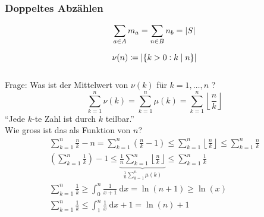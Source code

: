 \subsubsection{Doppeltes Abzählen}
\[ \sum_{a \in A} m_a = \sum_{n \in B} n_b = \abs{S} \]
\begin{bsp*}
	\[\nu(n) \coloneqq \abs{\{ k> 0 : k \mid n \}} \]\\
	Frage: Was ist der Mittelwert von $\nu(k)$ für $k=1, \dotsc , n$ ? \\
	\[ \sum_{k=1}^n \nu(k) = \sum_{k=1}^n \mu(k) = \sum_{k=1}^n \left\lfloor \frac{n}{k} \right\rfloor \]
	\enquote{Jede $k$-te Zahl ist durch $k$ teilbar.} \\
	Wie gross ist das als Funktion von $n$? \\
	\begin{gather*}
		\sum_{k=1}^n \frac{n}{k} - n = \sum_{k=1}^n (\frac{n}{k} - 1) \leq \sum_{k=1}^n \left\lfloor \frac{n}{k} \right\rfloor \leq \sum_{k=1}^n \frac{n}{k} \\
		\left(\sum_{k=1}^n \frac{1}{k}\right) -1 \leq \underbrace{\frac{1}{n} \sum_{k=1}^n \left\lfloor \frac{n}{k} \right\rfloor}_{\frac{1}{n} \sum_{k=1}^n \mu(k)} \leq \sum_{k=1}^n  \frac{1}{k} \\
		\sum_{k=1}^n  \frac{1}{k} \geq \int_0^n \frac{1}{x+1} \:\mathrm{d}x = \ln(n+1) \geq \ln(x) \\
		\sum_{k=1}^n  \frac{1}{k} \leq \int_1^n \frac{1}{x} \:\mathrm{d}x+1 = \ln(n) +1
	\end{gather*}
\end{bsp*}
